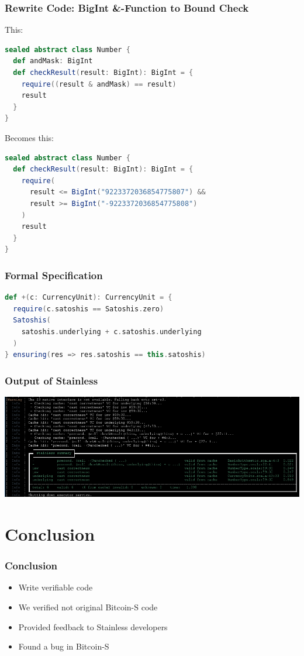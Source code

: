 \documentclass{beamer}
\begin{document}
\begin{frame}[fragile]
\frametitle{Rewrite Code: BigInt \&-Function to Bound Check}
This:
\begin{lstlisting}[language=Scala]
sealed abstract class Number {
  def andMask: BigInt
  def checkResult(result: BigInt): BigInt = {
    require((result & andMask) == result)
    result
  }
}  
\end{lstlisting}
Becomes this:
\begin{lstlisting}[language=Scala]
sealed abstract class Number {
  def checkResult(result: BigInt): BigInt = {
    require(
      result <= BigInt("9223372036854775807") &&
      result >= BigInt("-9223372036854775808")
    )
    result
  }
}
\end{lstlisting}
\end{frame}


\begin{frame}[fragile]
\frametitle{Formal Specification}
\begin{lstlisting}[language=Scala]
def +(c: CurrencyUnit): CurrencyUnit = {
  require(c.satoshis == Satoshis.zero)
  Satoshis(
    satoshis.underlying + c.satoshis.underlying
  )
} ensuring(res => res.satoshis == this.satoshis)
\end{lstlisting}
\end{frame}


\begin{frame}
\frametitle{Output of Stainless}
\centering
\includegraphics[width=\textwidth,height=0.8\textheight,keepaspectratio]{assets/final_verify_output.png}
\end{frame}


\section{Conclusion}

\begin{frame}
\frametitle{Conclusion}
\begin{itemize}
  \item Write verifiable code
  \item We verified not original Bitcoin-S code
  \item Provided feedback to Stainless developers
  \item Found a bug in Bitcoin-S
\end{itemize}
\end{frame}
\end{document}

